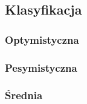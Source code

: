\subsection{Klasyfikacja}
\subsubsection{Optymistyczna}

\subsubsection{Pesymistyczna}


\subsubsection{Średnia}
